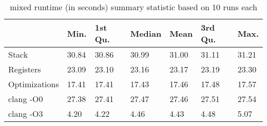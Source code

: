 \begin{table}[h!]
\centering
\begin{tabular}{p{}p{}p{}p{}p{}p{}p{}}
  \hline
 & Min. & 1st Qu. & Median & Mean & 3rd Qu. & Max. \\ 
  \hline
Stack & 30.84 & 30.86 & 30.99 & 31.00 & 31.11 & 31.21 \\ 
  Registers & 23.09 & 23.10 & 23.16 & 23.17 & 23.19 & 23.30 \\ 
  Optimizations & 17.41 & 17.41 & 17.43 & 17.46 & 17.48 & 17.57 \\ 
  clang -O0 & 27.38 & 27.41 & 27.47 & 27.46 & 27.51 & 27.54 \\ 
  clang -O3 & 4.20 & 4.22 & 4.46 & 4.43 & 4.48 & 5.07 \\ 
   \hline
\end{tabular}
\caption{mixed runtime (in seconds) summary statistic based on 10 runs each}
\end{table}
